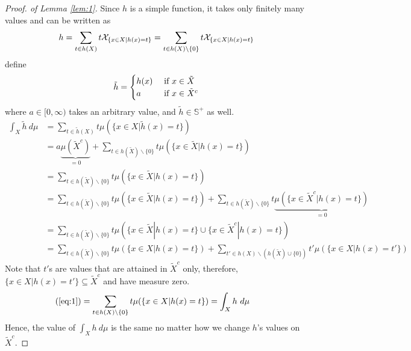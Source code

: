 \documentclass[11pt]{article}
\begin{document}
	\begin{proof}[Proof. of Lemma \ref{lem:1}]
		Since $h$ is a simple function, it takes only finitely many values and can be written as
		\begin{align}
			h = \sum_{t \in h(X)} t \mathcal{{X}}_{\{x \in X | h(x) = t\}} = \sum_{t \in h(X) \backslash \{0\}} t \mathcal{{X}}_{\{x \in X | h(x) = t\}}
		\end{align}
		define 
		\begin{align}
			\tilde{h} = \begin{cases}
				h(x) &\text{{ if }} x \in \tilde{X} \\
				a &\text{{ if }} x \in \tilde{X}^c
			\end{cases}
		\end{align}
		where $a \in [0, \infty)$ takes an arbitrary value, and $\tilde{h} \in \mathbb{S}^+$ as well.
		\begin{align}
			\int_X \tilde{h}\ d\mu &= \sum_{t \in \tilde{h}(X)} t \mu(\{x \in X | \tilde{h}(x) = t\})\\
			&= a \underbrace{\mu(\tilde{X}^c)}_{=0} + \sum_{t \in h(\tilde{X}) \backslash \{0\}} t \mu(\{x \in \tilde{X} | h(x) = t\}) \\
			&= \sum_{t \in h(\tilde{X}) \backslash \{0\}} t \mu(\{x \in \tilde{X} | h(x) = t\}) \\
			&= \sum_{t \in h(\tilde{X}) \backslash \{0\}} t \mu(\{x \in \tilde{X} | h(x) = t\}) +
			\sum_{t \in h(\tilde{X}) \backslash\{0\}} t \underbrace{\mu(\{x \in \tilde{X}^c | h(x) = t\})
			}_{=0} \\
			&= \sum_{t \in h(\tilde{X}) \backslash \{0\}} t \mu(\{x \in \tilde{X} | h(x) = t\} \cup \{x \in \tilde{X}^c | h(x) = t\}) \\
			&= \sum_{t \in h(\tilde{X}) \backslash \{0\}} t \mu(\{x \in X | h(x) = t\}) + \sum_{t' \in h(X) \backslash (h(\tilde{X}) \cup \{0\})} t' \mu(\{x \in X | h(x) = t'\}) \label{eq:1}
		\end{align}
		Note that $t'$s are values that are attained in $\tilde{X}^c$ only, therefore, $\{x \in X | h(x) = t'\} \subseteq \tilde{X}^c$ and have measure zero.
		\begin{align}
			(\ref{eq:1}) &= \sum_{t \in h(X) \backslash \{0\}} t \mu(\{x \in X | h(x) = t\}) = \int_X h\ d\mu
		\end{align}
		Hence, the value of $\int_X h\ d\mu$ is the same no matter how we change $h$'s values on $\tilde{X}^c$.
	\end{proof}
	
\end{document}
